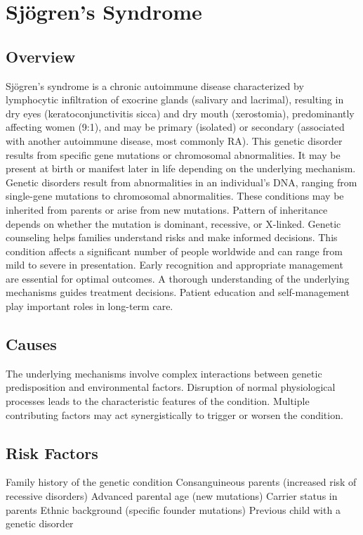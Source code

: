 \chapter{Sjögren's Syndrome}
\label{sec:Sjögren's Syndrome}

\section{Overview}
Sjögren's syndrome is a chronic autoimmune disease characterized by lymphocytic infiltration of exocrine glands (salivary and lacrimal), resulting in dry eyes (keratoconjunctivitis sicca) and dry mouth (xerostomia), predominantly affecting women (9:1), and may be primary (isolated) or secondary (associated with another autoimmune disease, most commonly RA). This genetic disorder results from specific gene mutations or chromosomal abnormalities. It may be present at birth or manifest later in life depending on the underlying mechanism. Genetic disorders result from abnormalities in an individual's DNA, ranging from single-gene mutations to chromosomal abnormalities. These conditions may be inherited from parents or arise from new mutations. Pattern of inheritance depends on whether the mutation is dominant, recessive, or X-linked. Genetic counseling helps families understand risks and make informed decisions. This condition affects a significant number of people worldwide and can range from mild to severe in presentation. Early recognition and appropriate management are essential for optimal outcomes. A thorough understanding of the underlying mechanisms guides treatment decisions. Patient education and self-management play important roles in long-term care.
\section{Causes}
The underlying mechanisms involve complex interactions between genetic predisposition and environmental factors. Disruption of normal physiological processes leads to the characteristic features of the condition. Multiple contributing factors may act synergistically to trigger or worsen the condition.
\section{Risk Factors}
Family history of the genetic condition Consanguineous parents (increased risk of recessive disorders) Advanced parental age (new mutations) Carrier status in parents Ethnic background (specific founder mutations) Previous child with a genetic disorder

